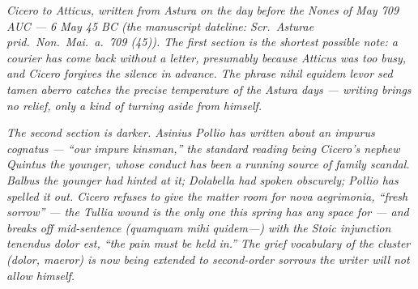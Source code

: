 
\textit{Cicero to Atticus, written from Astura on the
day before the Nones of May 709 AUC --- 6 May 45 BC
(the manuscript dateline: \textit{Scr.\ Asturae prid.\
Non.\ Mai.\ a.\ 709 (45)}). The first section is the
shortest possible note: a courier has come back
without a letter, presumably because Atticus was too
busy, and Cicero forgives the silence in advance.
The phrase \textit{nihil equidem levor sed tamen
aberro} catches the precise temperature of the Astura
days --- writing brings no relief, only a kind of
turning aside from himself.}

\textit{The second section is darker. Asinius Pollio
has written about an \textit{impurus cognatus} ---
``our impure kinsman,'' the standard reading being
Cicero's nephew Quintus the younger, whose conduct
has been a running source of family scandal. Balbus
the younger had hinted at it; Dolabella had spoken
obscurely; Pollio has spelled it out. Cicero refuses
to give the matter room for \textit{nova aegrimonia},
``fresh sorrow'' --- the Tullia wound is the only one
this spring has any space for --- and breaks off
mid-sentence (\textit{quamquam mihi quidem---}) with
the Stoic injunction \textit{tenendus dolor est},
``the pain must be held in.'' The grief vocabulary of
the cluster (\textit{dolor}, \textit{maeror}) is now
being extended to second-order sorrows the writer
will not allow himself.}
